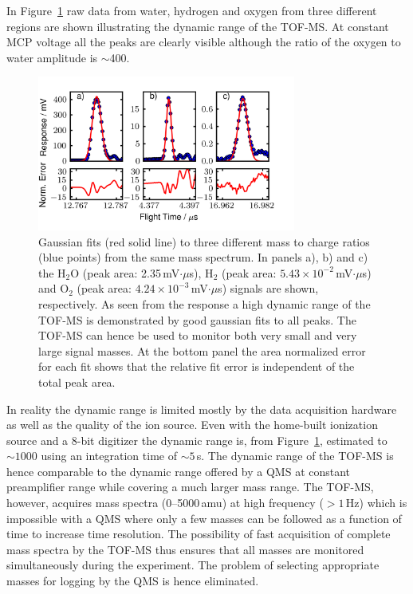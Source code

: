 \documentclass[aip,rsi]{revtex4-1}
\begin{document}
In Figure~\ref{fig:dynamic_range} raw data from water, hydrogen and oxygen from three different regions are shown illustrating the dynamic range of the TOF-MS. At constant MCP voltage all the peaks are clearly visible although the ratio of the oxygen to water amplitude is $\sim$400. 
\begin{figure}
 \includegraphics[width=8.5cm]{dynamic_range.png}%
 \caption{Gaussian fits (red solid line) to three different mass to charge
 ratios (blue points) from the same mass spectrum. In panels a), b) and c) the H$_2$O (peak area: 2.35\,mV$\cdot\mu$s), H$_2$ (peak area: $5.43\times10^{-2}$\,mV$\cdot\mu$s) and O$_2$ (peak area: $4.24\times10^{-3}$\,mV$\cdot\mu$s) signals are shown, respectively. As seen from the
 response a high dynamic range of the TOF-MS is demonstrated by good gaussian
 fits to all peaks. The TOF-MS can hence be used to monitor both very small and
 very large signal masses. At the bottom panel the area normalized error for
 each fit shows that the relative fit error is independent of the total peak
 area.\label{fig:dynamic_range}}%

\end{figure}
In reality the dynamic range is limited mostly by the data acquisition hardware as well as the quality of the ion source. Even with the home-built ionization source and a 8-bit digitizer the dynamic range is, from Figure~\ref{fig:dynamic_range}, estimated to $\sim1000$ using an integration time of $\sim5$\,s. The dynamic range of the TOF-MS is hence comparable to the dynamic range offered by a QMS at constant preamplifier range while covering a much larger mass range. The TOF-MS, however, acquires mass spectra (\mbox{0--5000}\,amu) at high frequency ($>1$\,Hz) which is impossible with a QMS where only a few masses can be followed as a function of time to increase time resolution. The possibility of fast acquisition of complete mass spectra by the TOF-MS thus ensures that all masses are monitored simultaneously during the experiment. The problem of selecting appropriate masses for logging by the QMS is hence eliminated.
\end{document}
